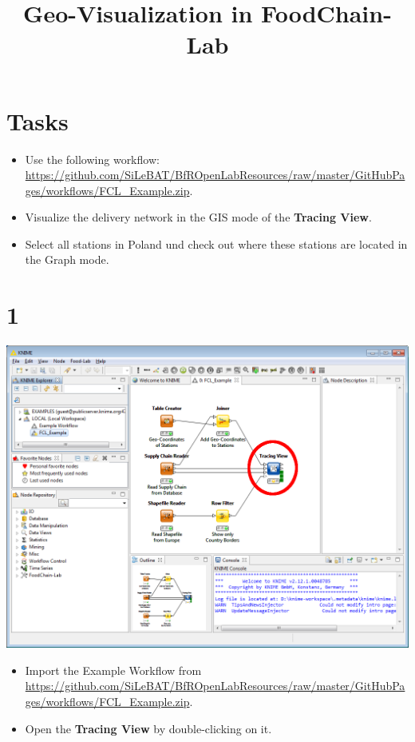 \documentclass{beamer}
\title{Geo-Visualization in FoodChain-Lab}
\date{}
\begin{document}
\maketitle

\section{Tasks}
\begin{frame}
	\begin{itemize}
		\item Use the following workflow: \url{https://github.com/SiLeBAT/BfROpenLabResources/raw/master/GitHubPages/workflows/FCL_Example.zip}.
		\item Visualize the delivery network in the GIS mode of the \textbf{Tracing View}.
		\item Select all stations in Poland und check out where these stations are located in the Graph mode.
	\end{itemize}
\end{frame}
 
\section{1}
\begin{frame}
	\begin{center}
  		\includegraphics[height=0.6\textheight]{1.png}
	\end{center}
	\begin{itemize}
		\item Import the Example Workflow from \url{https://github.com/SiLeBAT/BfROpenLabResources/raw/master/GitHubPages/workflows/FCL_Example.zip}.
		\item Open the \textbf{Tracing View} by double-clicking on it.
	\end{itemize}
\end{frame}
\end{document}
